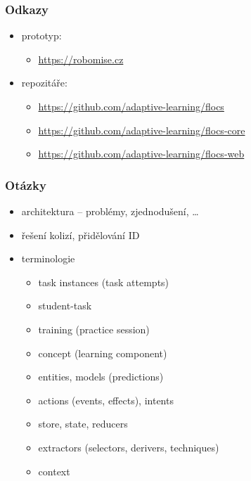 \documentclass[xcolor=dvipsnames, 14pt]{beamer}
\begin{document}
\begin{frame}
\frametitle{Odkazy}
\begin{itemize}
\item prototyp:
  \begin{itemize}
  \item \footnotesize{\url{https://robomise.cz}}
  \end{itemize}
\item repozitáře:
  \begin{itemize}
  \item \footnotesize{\url{https://github.com/adaptive-learning/flocs}}
  \item \footnotesize{\url{https://github.com/adaptive-learning/flocs-core}}
  \item \footnotesize{\url{https://github.com/adaptive-learning/flocs-web}}
  \end{itemize}
\end{itemize}
\end{frame}

\begin{frame}
\frametitle{Otázky}
\begin{itemize}
\item architektura -- problémy, zjednodušení, \ldots
\item řešení kolizí, přidělování ID
\item terminologie
  \begin{itemize}
  \item task instances (task attempts)
  \item student-task
  \item training (practice session)
  \item concept (learning component)
  \item entities, models (predictions)
  \item actions (events, effects), intents
  \item store, state, reducers
  \item extractors (selectors, derivers, techniques)
  \item context
  \end{itemize}
\end{itemize}
\end{frame}
\end{document}
